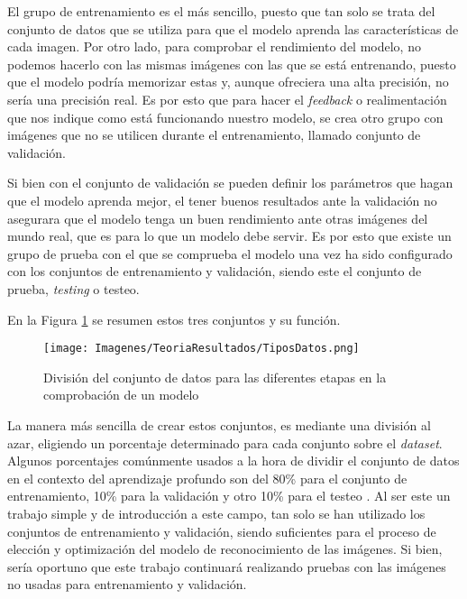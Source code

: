\documentclass{report}
\begin{document}
El grupo de entrenamiento es el más sencillo, puesto que tan solo se trata del conjunto de datos que se utiliza para que el modelo aprenda las características de cada imagen. Por otro lado, para comprobar el rendimiento del modelo, no podemos hacerlo con las mismas imágenes con las que se está entrenando, puesto que el modelo podría memorizar estas y, aunque ofreciera una alta precisión, no sería una precisión real. Es por esto que para hacer el \textit{feedback} o realimentación que nos indique como está funcionando nuestro modelo, se crea otro grupo con imágenes que no se utilicen durante el entrenamiento, llamado conjunto de validación.

Si bien con el conjunto de validación se pueden definir los parámetros que hagan que el modelo aprenda mejor, el tener buenos resultados ante la validación no asegurara que el modelo tenga un buen rendimiento ante otras imágenes del mundo real, que es para lo que un modelo debe servir. Es por esto que existe un grupo de prueba con el que se comprueba el modelo una vez ha sido configurado con los conjuntos de entrenamiento y validación, siendo este el conjunto de prueba, \textit{testing} o testeo.

En la Figura \ref{fig:DataTrainValTest} se resumen estos tres conjuntos y su función.

\begin{figure}[hbpt]
      \centering
	 \texttt{[image: Imagenes/TeoriaResultados/TiposDatos.png]}
	 \caption{ División del conjunto de datos para las diferentes etapas en la comprobación de un modelo }
	 \label{fig:DataTrainValTest}
\end{figure}



La manera más sencilla de crear estos conjuntos, es mediante una división al azar, eligiendo un porcentaje determinado para cada conjunto sobre el \textit{dataset}. Algunos porcentajes comúnmente usados a la hora de dividir el conjunto de datos en el contexto del aprendizaje profundo son del 80\% para el conjunto de entrenamiento, 10\% para la validación y otro 10\% para el testeo \cite{PorcentajesValidacion}. Al ser este un trabajo simple y de introducción a este campo, tan solo se han utilizado los conjuntos de entrenamiento y validación, siendo suficientes para el proceso de elección y optimización del modelo de reconocimiento de las imágenes. Si bien, sería oportuno que este trabajo continuará realizando pruebas con las imágenes no usadas para entrenamiento y validación.
\end{document}
